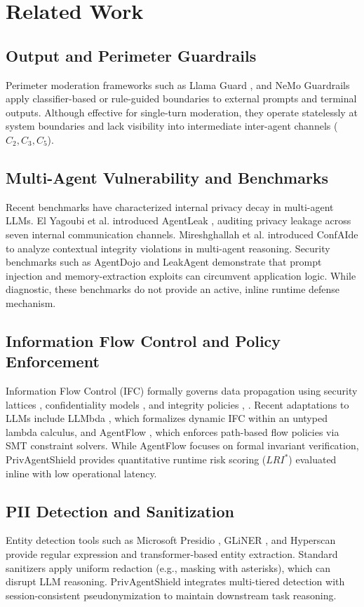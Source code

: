 \documentclass[conference]{IEEEtran}
\begin{document}
\section{Related Work}
\subsection{Output and Perimeter Guardrails}
Perimeter moderation frameworks such as Llama Guard \cite{15}, \cite{16} and NeMo Guardrails \cite{17} apply classifier-based or rule-guided boundaries to external prompts and terminal outputs. Although effective for single-turn moderation, they operate statelessly at system boundaries and lack visibility into intermediate inter-agent channels ($C_2, C_3, C_5$).

\subsection{Multi-Agent Vulnerability and Benchmarks}
Recent benchmarks have characterized internal privacy decay in multi-agent LLMs. El Yagoubi et al. introduced AgentLeak \cite{1}, auditing privacy leakage across seven internal communication channels. Mireshghallah et al. introduced ConfAIde \cite{6} to analyze contextual integrity violations in multi-agent reasoning. Security benchmarks such as AgentDojo \cite{2} and LeakAgent \cite{5} demonstrate that prompt injection and memory-extraction exploits can circumvent application logic. While diagnostic, these benchmarks do not provide an active, inline runtime defense mechanism.

\subsection{Information Flow Control and Policy Enforcement}
Information Flow Control (IFC) formally governs data propagation using security lattices \cite{10}, confidentiality models \cite{11}, and integrity policies \cite{12}, \cite{13}. Recent adaptations to LLMs include LLMbda \cite{8}, which formalizes dynamic IFC within an untyped lambda calculus, and AgentFlow \cite{3}, which enforces path-based flow policies via SMT constraint solvers. While AgentFlow focuses on formal invariant verification, PrivAgentShield provides quantitative runtime risk scoring ($LRI^*$) evaluated inline with low operational latency.

\subsection{PII Detection and Sanitization}
Entity detection tools such as Microsoft Presidio \cite{18}, GLiNER \cite{19}, and Hyperscan \cite{20} provide regular expression and transformer-based entity extraction. Standard sanitizers apply uniform redaction (e.g., masking with asterisks), which can disrupt LLM reasoning. PrivAgentShield integrates multi-tiered detection with session-consistent pseudonymization to maintain downstream task reasoning.
\end{document}
